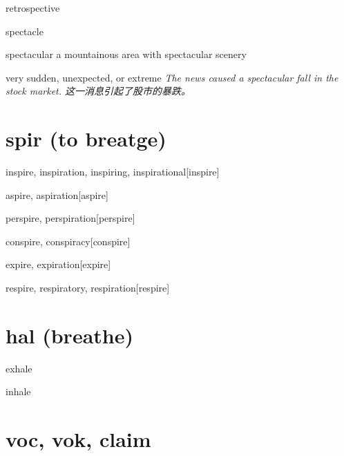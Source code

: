 \begin{wordRef}{retrospective}
\end{wordRef}

\begin{wordRef}{spectacle}
\end{wordRef}

\begin{wordRef}{spectacular}
    a mountainous area with spectacular scenery

    very sudden, unexpected, or extreme
    \textit{The news caused a spectacular fall in the stock market. 这一消息引起了股市的暴跌。}
\end{wordRef}


















\section{spir (to breatge)}





\begin{wordRef}{inspire, inspiration, inspiring, inspirational}[inspire]
\end{wordRef}

\begin{wordRef}{aspire, aspiration}[aspire]
\end{wordRef}

\begin{wordRef}{perspire, perspiration}[perspire]
\end{wordRef}

\begin{wordRef}{conspire, conspiracy}[conspire]
\end{wordRef}

\begin{wordRef}{expire, expiration}[expire]
\end{wordRef}

\begin{wordRef}{respire, respiratory, respiration}[respire]
\end{wordRef}


\section{hal (breathe)}

\begin{wordRef}{exhale}
\end{wordRef}

\begin{wordRef}{inhale}
\end{wordRef}




\section{voc, vok, claim}